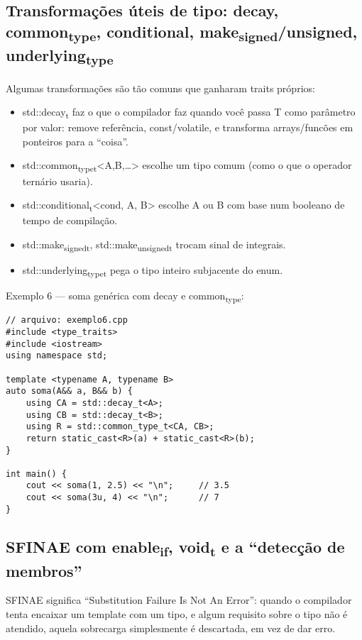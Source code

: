 \documentclass[11pt]{article}
\begin{document}
\subsection{Transformações úteis de tipo: decay, common\textsubscript{type}, conditional, make\textsubscript{signed}/unsigned, underlying\textsubscript{type}}
\label{sec:orgaab22a5}

Algumas transformações são tão comuns que ganharam traits próprios:
\begin{itemize}
\item std::decay\textsubscript{t} faz o que o compilador faz quando você passa T como parâmetro por valor: remove referência, const/volatile, e transforma arrays/funcões em ponteiros para a “coisa”.
\item std::common\textsubscript{type}\textsubscript{t}<A,B,\ldots{}> escolhe um tipo comum (como o que o operador ternário usaria).
\item std::conditional\textsubscript{t}<cond, A, B> escolhe A ou B com base num booleano de tempo de compilação.
\item std::make\textsubscript{signed}\textsubscript{t}, std::make\textsubscript{unsigned}\textsubscript{t} trocam sinal de integrais.
\item std::underlying\textsubscript{type}\textsubscript{t} pega o tipo inteiro subjacente do enum.
\end{itemize}

Exemplo 6 — soma genérica com decay e common\textsubscript{type}:
\begin{verbatim}
// arquivo: exemplo6.cpp
#include <type_traits>
#include <iostream>
using namespace std;

template <typename A, typename B>
auto soma(A&& a, B&& b) {
    using CA = std::decay_t<A>;
    using CB = std::decay_t<B>;
    using R = std::common_type_t<CA, CB>;
    return static_cast<R>(a) + static_cast<R>(b);
}

int main() {
    cout << soma(1, 2.5) << "\n";     // 3.5
    cout << soma(3u, 4) << "\n";      // 7
}
\end{verbatim}
\subsection{SFINAE com enable\textsubscript{if}, void\textsubscript{t} e a “detecção de membros”}
\label{sec:org7149a24}

SFINAE significa “Substitution Failure Is Not An Error”: quando o compilador tenta encaixar um template com um tipo, e algum requisito sobre o tipo não é atendido, aquela sobrecarga simplesmente é descartada, em vez de dar erro.
\end{document}
